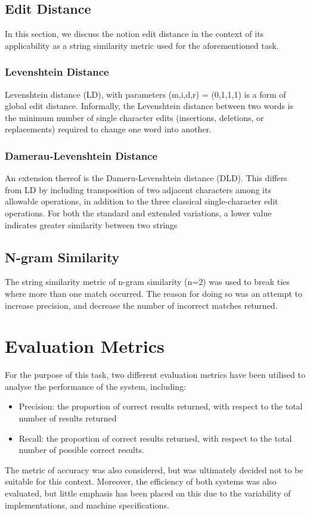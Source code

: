 \documentclass[11pt]{article}
\begin{document}
\subsection{Edit Distance}
In this section, we discuss the notion edit distance in the context of its applicability as a string similarity metric used for the aforementioned task. 

\subsubsection{Levenshtein Distance}
Levenshtein distance (LD), with parameters (m,i,d,r) = (0,1,1,1) is a form of global edit distance. Informally, the Levenshtein distance between two words is the minimum number of single character edits (insertions, deletions, or replacements) required to change one word into another. 

\subsubsection{Damerau-Levenshtein Distance}
An extension thereof is the Dameru-Levenshtein distance (DLD). This differs from LD by including transposition of two adjacent characters among its allowable operations, in addition to the three classical  single-character edit operations. For both the standard and extended variations, a lower value indicates greater similarity between two strings

\subsection{N-gram Similarity}
The string similarity metric of n-gram similarity (n=2) was used to break ties where more than one match occurred. The reason for doing so was an attempt to increase precision, and decrease the number of incorrect matches returned.


\section{Evaluation Metrics}
For the purpose of this task, two different evaluation metrics have been utilised to analyse the performance of the system, including:
\begin{itemize}
\item Precision: the proportion of correct results returned, with respect to the total number of results returned
\item Recall: the proportion of correct results returned, with respect to the total number of possible correct results.
\end{itemize}
The metric of accuracy was also considered, but was ultimately decided not to be suitable for this context.
Moreover, the efficiency of both systems was also evaluated, but little emphasis has been placed on this
due to the variability of implementations, and machine specifications.
\end{document}

